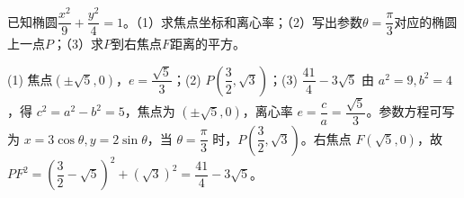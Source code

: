 \begin{question}[GPT生成]
已知椭圆$\dfrac{x^2}{9}+\dfrac{y^2}{4}=1$。（1）求焦点坐标和离心率；（2）写出参数$\theta=\dfrac{\pi}{3}$对应的椭圆上一点$P$；（3）求$P$到右焦点$F$距离的平方。
\end{question}
\solutionSpace{5cm}
\begin{answer}{(1) 焦点$(\pm\sqrt5,0)$，$e=\dfrac{\sqrt5}{3}$；(2) $P(\dfrac32,\sqrt3)$；(3) $\dfrac{41}{4}-3\sqrt5$}
由 $a^2=9,b^2=4$，得 $c^2=a^2-b^2=5$，焦点为 $(\pm\sqrt5,0)$，离心率 $e=\dfrac ca=\dfrac{\sqrt5}{3}$。参数方程可写为 $x=3\cos\theta,y=2\sin\theta$，当 $\theta=\dfrac{\pi}{3}$ 时，$P(\dfrac32,\sqrt3)$。右焦点 $F(\sqrt5,0)$，故 $PF^2=(\dfrac32-\sqrt5)^2+(\sqrt3)^2=\dfrac{41}{4}-3\sqrt5$。
\end{answer}

\printChapterAnswers
